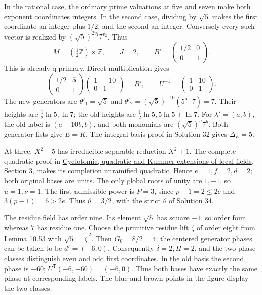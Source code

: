 \documentclass[
  11pt,
  a4paper,
]{article}
\begin{document}
In the rational case, the ordinary prime valuations at five and seven
make both exponent coordinates integers. In the second case, dividing by
\(\sqrt5\) makes the first coordinate an integer plus \(1/2\), and the
second an integer. Conversely every such vector is realized by
\((\sqrt5)^{2v_1}7^{v_2}\). Thus \[
M=(\tfrac12\mathbb Z)\times\mathbb Z,\qquad
J=2,\qquad
B'=\begin{pmatrix}1/2&0\\0&1\end{pmatrix}.
\] This is already q-primary. Direct multiplication gives \[
\begin{pmatrix}1/2&5\\0&1\end{pmatrix}
\begin{pmatrix}1&-10\\0&1\end{pmatrix}
=B',\qquad
U^{-1}=\begin{pmatrix}1&10\\0&1\end{pmatrix}.
\] The new generators are \(\theta'_1=\sqrt5\) and
\(\theta'_2=(\sqrt5)^{-10}(5^5\cdot7)=7\). Their heights are
\(\frac12\ln5,\ln7\); the old heights are \(\frac12\ln5,5\ln5+\ln7\).
For \(\lambda'= (a,b)\), the old label is \((a-10b,b)\), and both
monomials are \((\sqrt5)^a7^b\). Both generator lists give \(E=K\). The
integral-basis proof in Solution 32 gives \(\Delta_E=5\).

At three, \(X^2-5\) has irreducible separable reduction \(X^2+1\). The
complete quadratic proof in
\href{../../NT-LOC/NT-LOC-12.html\#3-quadratic-extensions-from-square-classes}{Cyclotomic,
quadratic and Kummer extensions of local fields}, Section 3, makes its
completion unramified quadratic. Hence \(e=1,f=2,d=2\); both original
bases are units. The only global roots of unity are \(1,-1\), so
\(u=1,\nu=1\). The first admissible power is \(P=3\), since
\(p-1=2\le2e\) and \(3(p-1)=6>2e\). Thus \(\vartheta=3/2\), with the
strict \(\theta\) of Solution 34.

The residue field has order nine. Its element \(\overline{\sqrt5}\) has
square \(-1\), so order four, whereas \(7\) has residue one. Choose the
primitive residue lift \(\zeta\) of order eight from Lemma 10.53 with
\(\overline{\sqrt5}=\overline\zeta^{\,2}\). Then \(G_0=8/2=4\); the
centered generator phases can be taken to be \(d'=(-6,0)\). Consequently
\(\delta=2,H=2\), and the two phase classes distinguish even and odd
first coordinates. In the old basis the second phase is \(-60\);
\(U^{\mathsf T}(-6,-60)=(-6,0)\). Thus both bases have exactly the same
phase at corresponding labels. The blue and brown points in the figure
display the two classes.
\end{document}
